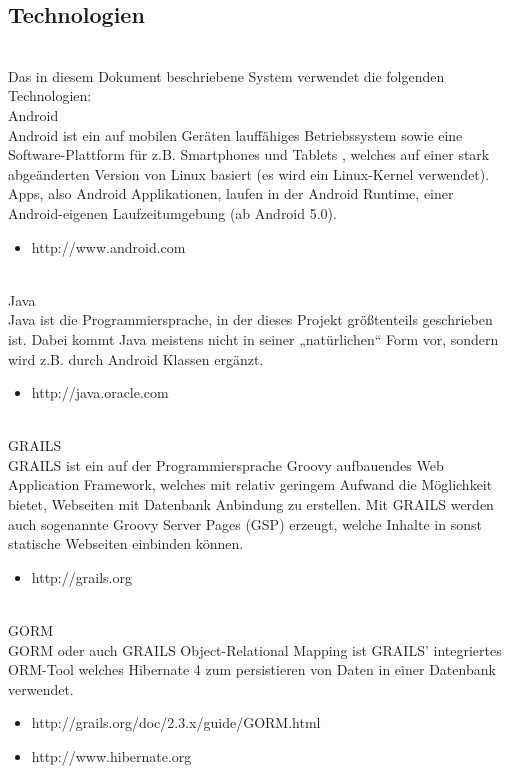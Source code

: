 \subsection{Technologien}\\
Das in diesem Dokument beschriebene System verwendet die folgenden Technologien:\\
Android\\
Android ist ein auf mobilen Ger\"aten lauff\"ahiges Betriebssystem sowie eine Software-Plattform f\"ur z.B. Smartphones und Tablets , welches auf einer stark abgeänderten Version von Linux basiert (es wird ein Linux-Kernel verwendet). Apps, also Android Applikationen, laufen in der Android Runtime, einer Android-eigenen Laufzeitumgebung (ab Android 5.0).\\
\begin{itemize}\\
\item http://www.android.com\\
\end{itemize}\\
Java\\
Java ist die Programmiersprache, in der dieses Projekt größtenteils geschrieben ist. Dabei kommt Java meistens nicht in seiner „natürlichen“ Form vor, sondern wird z.B. durch Android Klassen ergänzt.\\
\begin{itemize}
\item http://java.oracle.com\\
\end{itemize}\\
GRAILS\\
GRAILS ist ein auf der Programmiersprache Groovy aufbauendes Web Application Framework, welches mit relativ geringem Aufwand die Möglichkeit bietet, Webseiten mit Datenbank Anbindung zu erstellen. Mit GRAILS werden auch sogenannte Groovy Server Pages (GSP) erzeugt, welche Inhalte in sonst statische Webseiten einbinden können.\\
\begin{itemize}
\item http://grails.org\\
\end{itemize}\\
GORM\\
GORM oder auch GRAILS Object-Relational Mapping ist GRAILS' integriertes ORM-Tool welches Hibernate 4 zum persistieren von Daten in einer Datenbank verwendet.\\
\begin{itemize}
\item http://grails.org/doc/2.3.x/guide/GORM.html\\
\item http://www.hibernate.org\\
\end{itemize}\\
